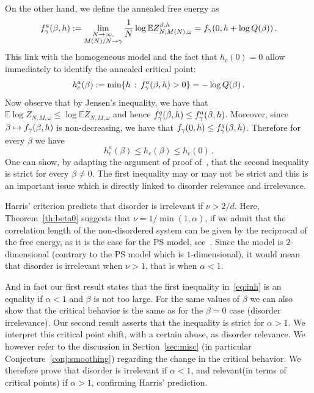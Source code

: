 \documentclass[11pt]{article}
\theoremstyle{definition}
\numberwithin{equation}{section}
\numberwithin{figure}{section}
\numberwithin{table}{section}
\newcommand{\ga}{\alpha}
\newcommand{\gb}{\beta}
\newcommand{\tf}{\textsc{f}} %
\newcommand{\bbE}{\ensuremath{\mathbb{E}}}
\newcommand{\limtwo}[2]{\lim_{\substack{#1 \\ #2}}}
\begin{document}
On the other hand, we define the annealed free energy as
\begin{equation}
\tf_\gamma^{a}(\beta,h) := \limtwo{N\to\infty,}{M(N) / N \to \gamma} \frac{1}{N} \log \bbE Z_{N,M(N),\omega}^{\gb,h} = \tf_\gamma (0, h + \log Q(\beta))\,.
\end{equation}
This link with the homogeneous model and the fact that $h_c(0)=0$ allow immediately to identify the annealed critical point:
\begin{equation}\label{eq:hann}
h_c^{a}(\beta) := \min \lbrace h\,:\,\tf^{a}_\gamma (\beta,h) >0 \rbrace = - \log Q(\beta)\,.
\end{equation}
Now observe that by Jensen's inequality, we have that $\bbE \log Z_{N,M,\omega} \le \log \bbE Z_{N,M,\omega}$ and hence $\tf_\gamma^{q}(\beta,h) \le \tf_\gamma^{a}(\beta,h)$. Moreover, since $\beta \mapsto \tf_\gamma (\beta,h)$ is non-decreasing, we have that $\tf_\gamma (0,h) \le \tf^{q}_\gamma (\beta,h) $. Therefore for every $\beta$ we have
\begin{equation}\label{eq:inh}
h_c^{a}(\beta)\le h_c(\beta) \le h_c(0)\,.
\end{equation}
One can show, by adapting the argument of proof of~\cite[Theorem~5.2]{cf:G}, that the second inequality is strict for every $\gb \neq 0$. The first inequality may or may not be strict and this is an important issue which is directly linked to disorder relevance and irrelevance.


Harris' criterion predicts that disorder is irrelevant if $\nu>2/d$. Here, Theorem~\ref{th:beta0} suggests that $\nu=1/\min(1,\alpha)$, if we admit that the correlation length of the non-disordered system can be given by the reciprocal of the free energy, as it is the case for the PS model, see~\cite{cf:G08}. Since the model is $2$-dimensional (contrary to the PS model which is $1$-dimensional), it would mean that disorder is irrelevant when $\nu>1$, that is when $\ga<1$.



And in fact our first result states that the first inequality in~\eqref{eq:inh} is an equality if $\ga<1$ and $\gb$ is not too large. For the same values of $\gb$ we can also show that the critical behavior is the same as for the $\gb=0$ case (disorder irrelevance). Our second result asserts that the inequality is strict for $\ga>1$. We interpret this critical point shift, with a certain abuse, as disorder relevance. We however refer to the discussion in Section~\ref{sec:misc} (in particular Conjecture~\ref{conj:smoothing}) regarding the change in the critical behavior. We therefore prove that disorder is irrelevant if $\ga<1$, and relevant\linebreak(in terms of critical points) if $\ga>1$, confirming Harris' prediction.
\end{document}
